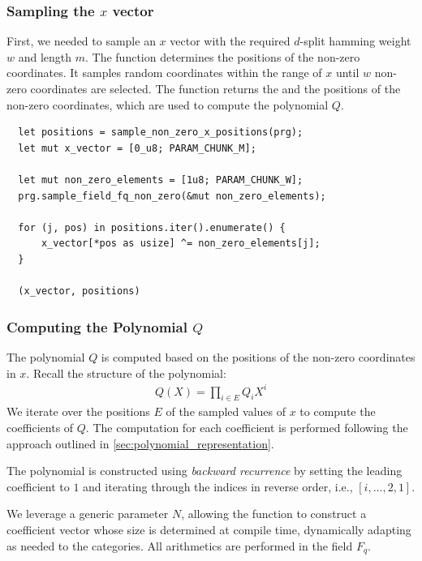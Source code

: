 \documentclass[11pt]{report}
\theoremstyle{definition}
\theoremstyle{plain}
\begin{document}
\subsubsection{Sampling the $x$ vector}

First, we needed to sample an $x$ vector with the required $d$-split hamming weight $w$ and length $m$. The function  determines the positions of the non-zero coordinates. It samples random coordinates within the range of $x$ until $w$ non-zero coordinates are selected. The function returns the  and the positions of the non-zero coordinates, which are used to compute the polynomial $Q$.

\begin{verbatim}
  let positions = sample_non_zero_x_positions(prg);
  let mut x_vector = [0_u8; PARAM_CHUNK_M];
  
  let mut non_zero_elements = [1u8; PARAM_CHUNK_W];
  prg.sample_field_fq_non_zero(&mut non_zero_elements);

  for (j, pos) in positions.iter().enumerate() {
      x_vector[*pos as usize] ^= non_zero_elements[j];
  }

  (x_vector, positions)
\end{verbatim}

\subsubsection{Computing the Polynomial $Q$}

The polynomial $Q$ is computed based on the positions of the non-zero coordinates in $x$. Recall the structure of the polynomial:
\begin{align*}
  Q(X) = \prod_{i\in E} Q_i X^i
\end{align*}
We iterate over the positions $E$ of the sampled values of $x$ to compute the coefficients of $Q$. The computation for each coefficient is performed following the approach outlined in \autoref{sec:polynomial_representation}.

The polynomial is constructed using \textit{backward recurrence} by setting the leading coefficient to $1$ and iterating through the indices in reverse order, i.e., $[i, \dots, 2, 1]$.

We leverage a generic parameter $N$, allowing the function to construct a coefficient vector whose size is determined at compile time, dynamically adapting as needed to the categories. All arithmetics are performed in the field $F_q$.
\end{document}
